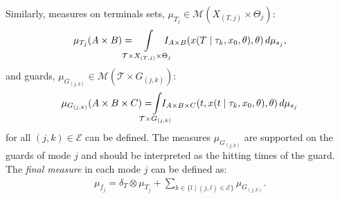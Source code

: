 Similarly, measures on terminals sets, $\mu_{T_j}\in \mathcal M(X_{(T,j)}\times \Theta_j)$:
\begin{align}
\mu_{T_j}(A\times B)= \hspace*{-4mm}\int\limits_{\mathcal T\times X_{(T,j)}\times \Theta_j}\hspace*{-4mm}I_{A\times B}(x(T\mid \tau_k,x_0,\theta),\theta)\,d\mu_{s_{j}},
\end{align}
and guards, $\mu_{ G_{(j,k)}}\in \mathcal M(\mathcal T\times  G_{(j,k)})$:
\begin{align}
\mu_{G_{(j,k)}}(A\times B\times C)=\hspace*{-5mm}\int\limits_{\mathcal T\times G_{(j,k)}}\hspace*{-5mm}I_{A\times B\times C}(t,x(t\mid \tau_k,x_0,\theta),\theta)\,d\mu_{s_{j}}
\end{align}
for all $(j,k) \in {\mathcal E}$ can be defined.
The measures $\mu_{ G_{(j,k)}}$ are supported on the guards of mode $j$ and should be interpreted as the hitting times of the guard.
The {\em final measure} in each mode $j$ can be defined as:
\begin{align}
  \mu_{f_j}=\delta_T\otimes \mu_{T_j}+\sum_{k\in\{l\mid (j,l)\in \mathcal E\}}\mu_{ G_{(j,k)}}.
\label{eq:mu_T}
\end{align}


